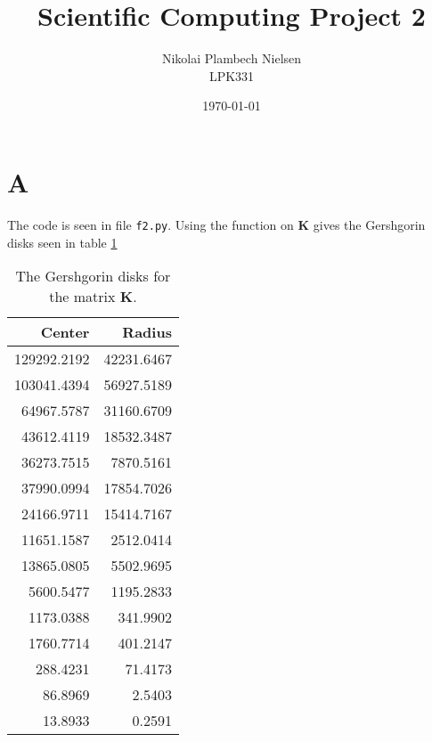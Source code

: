 \documentclass[a4paper,10pt]{article}
\title{Scientific Computing Project 2}
\author{Nikolai Plambech Nielsen\\LPK331}
\date{\today}
\begin{document}
	\maketitle
	\section*{A}
	The code is seen in file \texttt{f2.py}. Using the function on $ \textbf{K} $ gives the Gershgorin disks seen in table \ref{tab:disks}
	\begin{table}[H]
		\centering
		\begin{tabular}{r|r}
			Center & Radius \\
			\hline
			129292.2192 & 42231.6467 \\
			103041.4394 & 56927.5189 \\
			64967.5787 & 31160.6709 \\
			43612.4119 & 18532.3487 \\
			36273.7515 & 7870.5161 \\
			37990.0994 & 17854.7026 \\
			24166.9711 & 15414.7167 \\
			11651.1587 & 2512.0414 \\
			13865.0805 & 5502.9695 \\
			5600.5477 & 1195.2833 \\
			1173.0388 & 341.9902 \\
			1760.7714 & 401.2147 \\
			288.4231 & 71.4173 \\
			86.8969 & 2.5403 \\
			13.8933 & 0.2591
		\end{tabular}
	\caption{The Gershgorin disks for the matrix $ \textbf{K} $.}
	\label{tab:disks}
	\end{table}
	
\end{document}
